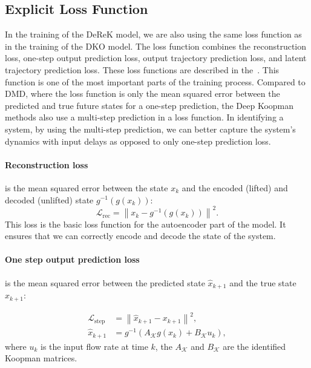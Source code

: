 \documentclass[conference]{IEEEtran}
\begin{document}
\subsection{Explicit Loss Function}
In the training of the DeReK model, we are also using the same loss function as in the training of the DKO model. The loss function combines the reconstruction loss, one-step output prediction loss, output trajectory prediction loss, and latent trajectory prediction loss. These loss functions are described in the~\cite{lusch2018deep}. This function is one of the most important parts of the training process. Compared to DMD, where the loss function is only the mean squared error between the predicted and true future states for a one-step prediction, the Deep Koopman methods also use a multi-step prediction in a loss function. In identifying a system, by using the multi-step prediction, we can better capture the system's dynamics with input delays as opposed to only one-step prediction loss.

\paragraph*{Reconstruction loss}
is the mean squared error between the state \(x_k\) and the encoded (lifted) and decoded (unlifted) state \(g^{-1}(g(x_k))\):
\begin{equation}
    \mathcal{L}_{\text{rec}} = \left\|x_k - g^{-1}(g(x_k))\right\|^2.
\end{equation}
This loss is the basic loss function for the autoencoder part of the model. It ensures that we can correctly encode and decode the state of the system.

\paragraph*{One step output prediction loss}
is the mean squared error between the predicted state \(\hat{x}_{k+1}\) and the true state \(x_{k+1}\):

\begin{subequations}
    \begin{align}
        \mathcal{L}_{\text{step}} & = \left\|\hat{x}_{k+1} - x_{k+1}\right\|^2,       \\
        \hat{x}_{k+1}             & = g^{-1}(A_\mathcal{K}g(x_k) + B_\mathcal{K}u_k),
    \end{align}
\end{subequations}
where \(u_k\) is the input flow rate at time \(k\), the \(A_\mathcal{K}\) and \(B_\mathcal{K}\) are the identified Koopman matrices.
\end{document}
